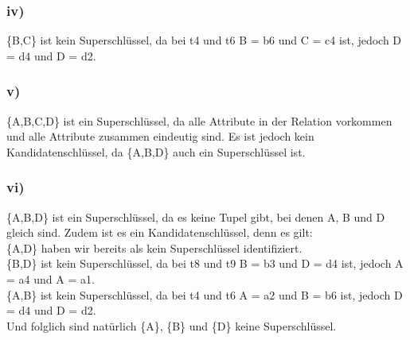\subsubsection*{iv)}
\{B,C\} ist kein Superschlüssel, da bei t4 und t6 B = b6 und C = c4 ist, jedoch D = d4 und D = d2.
\subsubsection*{v)}
\{A,B,C,D\} ist ein Superschlüssel, da alle Attribute in der Relation vorkommen und alle Attribute zusammen eindeutig sind. Es ist jedoch kein Kandidatenschlüssel, da \{A,B,D\} auch ein Superschlüssel ist.
\subsubsection*{vi)}
\{A,B,D\} ist ein Superschlüssel, da es keine Tupel gibt, bei denen A, B und D gleich sind. Zudem ist es ein Kandidatenschlüssel, denn es gilt: \\
\{A,D\} haben wir bereits als kein Superschlüssel identifiziert. \\
\{B,D\} ist kein Superschlüssel, da bei t8 und t9 B = b3 und D = d4 ist, jedoch A = a4 und A = a1. \\
\{A,B\} ist kein Superschlüssel, da bei t4 und t6 A = a2 und B = b6 ist, jedoch D = d4 und D = d2. \\
Und folglich sind natürlich \{A\}, \{B\} und \{D\} keine Superschlüssel.



